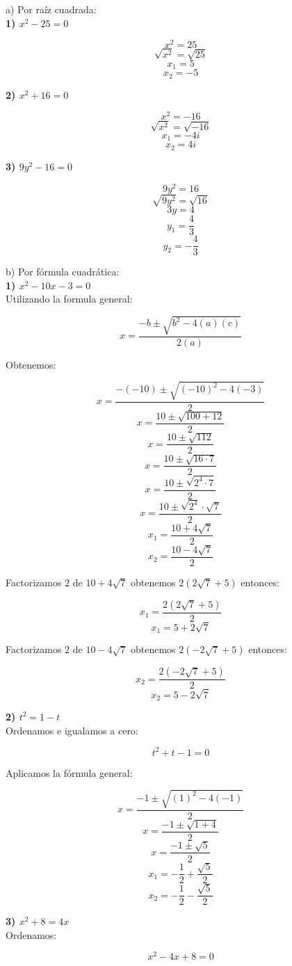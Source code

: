 \documentclass[11pt]{report}
\begin{document}
a) Por raíz cuadrada:\\[2mm]
\indent \textbf { 1) $x^{2}-25=0$ }

$$x^{2}=25$$
$$\sqrt {x^{2}}=\sqrt{ 25 }$$
$$x_1=5$$ $$x_2=-5$$

\indent \textbf { 2) $x^{2}+16=0$ }

$$x^{2}=-16$$
$$\sqrt{ x^{2} }=\sqrt{ -16 } $$
$$x_1=-4i$$ $$x_2=4i$$

\indent \textbf { 3) $9y^{2}-16=0$ }

$$9y^{2}=16$$
$$\sqrt{ 9y^{2} }=\sqrt{16}$$
$$3y=4$$
$$y_1=\frac{4}{3}$$ $$y_2=-\frac{4}{3}$$

\pagebreak b) Por fórmula cuadrática:\\[2mm]
\indent \textbf { 1) $x^{2}-10x-3=0$ }\\[2mm]
\indent Utilizando la formula general:

$$x=\frac{ -b\pm \sqrt{ b^{2}-4(a)(c) } }{ 2(a) }$$

\indent Obtenemos:

$$x=\frac{ -(-10)\pm \sqrt{ (-10)^{2}-4(-3) } }{ 2 }$$
$$x=\frac{ 10\pm \sqrt{ 100+12 } }{ 2 }$$
$$x=\frac{ 10\pm \sqrt{ 112 } }{ 2 }$$
$$x=\frac{ 10\pm \sqrt{ 16\cdot7 } }{ 2 }$$
$$x=\frac{ 10\pm \sqrt{ 2^{4}\cdot7 } }{ 2 }$$
$$x=\frac{ 10\pm \sqrt{ 2^{4}}\cdot\sqrt{7 } }{ 2 }$$
$$x_1=\frac{ 10+4\sqrt{7 } }{ 2 }$$
$$x_2=\frac{ 10-4\sqrt{7 } }{ 2 }$$

\indent Factorizamos $2$ de $10+4\sqrt{7}$ obtenemos $2(2\sqrt{7}+5)$ entonces:

$$x_1=\frac{ 2(2\sqrt{ 7 }+5) }{ 2 }$$
$$x_1=5+2\sqrt{7}$$

\indent Factorizamos $2$ de $10-4\sqrt{7}$ obtenemos $2(-2\sqrt{7}+5)$ entonces:

$$x_2=\frac{ 2(-2\sqrt{ 7 }+5) }{ 2 }$$
$$x_2=5-2\sqrt{7}$$

\indent \textbf { 2) $t^{2}=1-t$ }\\[2mm]
\indent Ordenamos e igualamos a cero:

$$t^{2}+t-1=0$$

\indent Aplicamos la fórmula general:

$$x=\frac{ -1\pm \sqrt{ (1)^{2}-4(-1) } }{ 2 }$$
$$x=\frac{ -1\pm \sqrt{ 1+4 } }{ 2 }$$
$$x=\frac{ -1\pm \sqrt{ 5 } }{ 2 }$$
$$x_1=-\frac{1}{2}+\frac{\sqrt{5}}{2}$$ $$x_2=-\frac{1}{2}-\frac{\sqrt{5}}{2}$$

\indent \textbf {3) $x^{2}+8=4x$ }\\[2mm]
\indent Ordenamos:

$$x^{2}-4x+8=0$$
\end{document}
